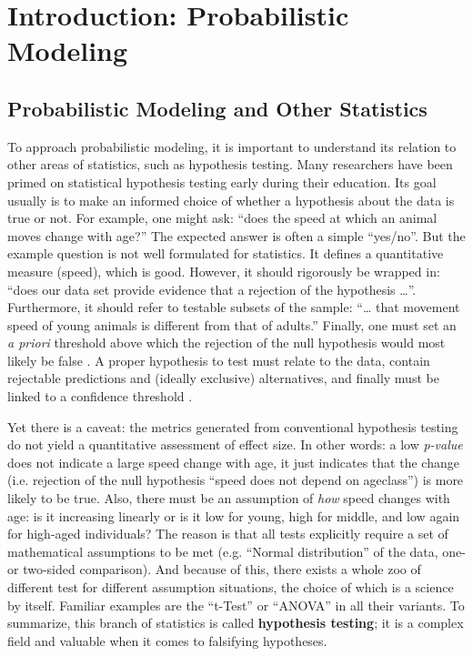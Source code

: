 \FloatBarrier
\clearpage
\section{Introduction: Probabilistic Modeling}
\label{sec:org2074548}
\subsection{Probabilistic Modeling and Other Statistics}
\label{sec:org0cc6a35}
To approach probabilistic modeling, it is important to understand its relation to other areas of statistics, such as hypothesis testing.
Many researchers have been primed on statistical hypothesis testing early during their education.
Its goal usually is to make an informed choice of whether a hypothesis about the data is true or not.
For example, one might ask: ``does the speed at which an animal moves change with age?''
The expected answer is often a simple ``yes/no''.
But the example question is not well formulated for statistics.
It defines a quantitative measure (speed), which is good.
However, it should rigorously be wrapped in: ``does our data set provide evidence that a rejection of the hypothesis \ldots{}''.
Furthermore, it should refer to testable subsets of the sample: ``\ldots{} that movement speed of young animals is different from that of adults.''
Finally, one must set an \emph{a priori} threshold above which the rejection of the null hypothesis would most likely be false \citep[called ``p-value'', too commonly desired to be below \(p=0.05\),][]{Dallal2003}.
A proper hypothesis to test must relate to the data, contain rejectable predictions and (ideally exclusive) alternatives, and finally must be linked to a confidence threshold \citep{Chamberlin1890,Platt1964,Popper2002}.

Yet there is a caveat: the metrics generated from conventional hypothesis testing do not yield a quantitative assessment of effect size.
In other words: a low \emph{p-value} does not indicate a large speed change with age, it just indicates that the change (i.e. rejection of the null hypothesis ``speed does not depend on ageclass'') is more likely to be true.
Also, there must be an assumption of \emph{how} speed changes with age: is it increasing linearly or is it low for young, high for middle, and low again for high-aged individuals?
The reason is that all tests explicitly require a set of mathematical assumptions to be met (e.g. ``Normal distribution'' of the data, one- or two-sided comparison).
And because of this, there exists a whole zoo of different test for different assumption situations, the choice of which is a science by itself.
Familiar examples are the ``t-Test'' or ``ANOVA'' in all their variants.
To summarize, this branch of statistics is called \textbf{hypothesis testing}; it is a complex field and valuable when it comes to falsifying hypotheses.


